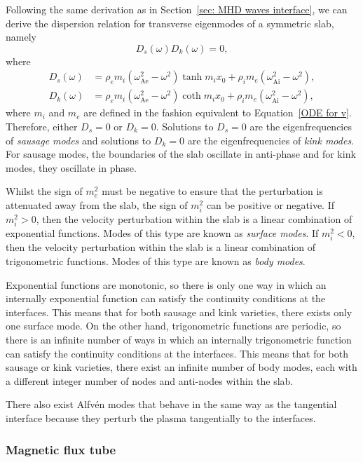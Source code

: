 Following the same derivation as in Section~\ref{sec: MHD waves interface}, we can derive the dispersion relation for transverse eigenmodes of a symmetric slab, namely
\begin{equation}
	D_s(\omega)D_k(\omega) = 0, \label{DR sym slab}
\end{equation}
where
\begin{align}
	D_s(\omega) &= \rho_em_i(\omega_\textrm{Ae}^2 - \omega^2)\tanh{m_ix_0} + \rho_im_e(\omega_\textrm{Ai}^2 - \omega^2), \\
	D_k(\omega) &= \rho_em_i(\omega_\textrm{Ae}^2 - \omega^2)\coth{m_ix_0} + \rho_im_e(\omega_\textrm{Ai}^2 - \omega^2),
\end{align}
where $m_i$ and $m_e$ are defined in the fashion equivalent to Equation~\eqref{ODE for v}. Therefore, either $D_s = 0$ or $D_k = 0$. Solutions to $D_s = 0$ are the eigenfrequencies of \textit{sausage modes} and solutions to $D_k = 0$ are the eigenfrequencies of \textit{kink modes}. For sausage modes, the boundaries of the slab oscillate in anti-phase and for kink modes, they oscillate in phase.

Whilst the sign of $m_e^2$ must be negative to ensure that the perturbation is attenuated away from the slab, the sign of $m_i^2$ can be positive or negative. If $m_i^2 > 0$, then the velocity perturbation within the slab is a linear combination of exponential functions. Modes of this type are known as \textit{surface modes}. If $m_i^2 < 0$, then the velocity perturbation within the slab is a linear combination of trigonometric functions. Modes of this type are known as \textit{body modes}.

Exponential functions are monotonic, so there is only one way in which an internally exponential function can satisfy the continuity conditions at the interfaces. This means that for both sausage and kink varieties, there exists only one surface mode. On the other hand, trigonometric functions are periodic, so there is an infinite number of ways in which an internally trigonometric function can satisfy the continuity conditions at the interfaces. This means that for both sausage or kink varieties, there exist an infinite number of body modes, each with a different integer number of nodes and anti-nodes within the slab.

There also exist Alfv\'{e}n modes that behave in the same way as the tangential interface because they perturb the plasma tangentially to the interfaces.


\subsubsection{Magnetic flux tube} \label{sec: MHD waves tube}

